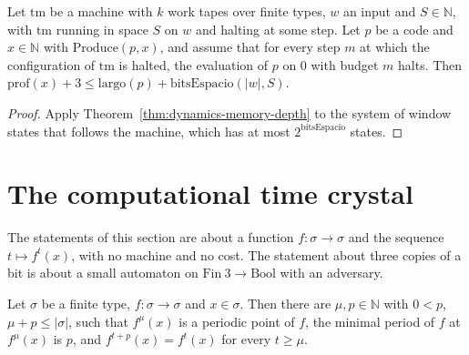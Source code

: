 \begin{theorem}
  \label{thm:dynamics-memory-depth-machine}
  \leanok
  Let $\mathrm{tm}$ be a machine with $k$ work tapes over finite types, $w$ an input and
  $S \in \mathbb{N}$, with $\mathrm{tm}$ running in space $S$ on $w$ and halting at some step. Let
  $p$ be a code and $x \in \mathbb{N}$ with $\mathrm{Produce}(p, x)$, and assume that for every step
  $m$ at which the configuration of $\mathrm{tm}$ is halted, the evaluation of $p$ on $0$ with
  budget $m$ halts. Then
  $\mathrm{prof}(x) + 3 \le \mathrm{largo}(p) + \mathrm{bitsEspacio}(|w|, S)$.
  \own{}
\end{theorem}

\begin{proof}
  \leanok
  Apply Theorem~\ref{thm:dynamics-memory-depth} to the system of window states that follows the
  machine, which has at most $2^{\mathrm{bitsEspacio}}$ states.
\end{proof}

\section{The computational time crystal}
\label{sec:dynamics-crystal}

The statements of this section are about a function $f : \sigma \to \sigma$ and the sequence
$t \mapsto f^{t}(x)$, with no machine and no cost. The statement about three copies of a bit is
about a small automaton on $\mathrm{Fin}\ 3 \to \mathrm{Bool}$ with an adversary.

\begin{theorem}
  \label{thm:dynamics-crystallize}
  \leanok
  Let $\sigma$ be a finite type, $f : \sigma \to \sigma$ and $x \in \sigma$. Then there are
  $\mu, p \in \mathbb{N}$ with $0 < p$, $\mu + p \le |\sigma|$, such that $f^{\mu}(x)$ is a periodic
  point of $f$, the minimal period of $f$ at $f^{\mu}(x)$ is $p$, and
  $f^{t+p}(x) = f^{t}(x)$ for every $t \ge \mu$.
  \own{}
\end{theorem}


